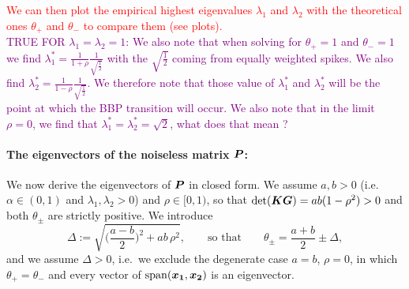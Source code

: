 \documentclass[11pt]{article}
\begin{document}
\textcolor{red}{We can then plot the empirical highest eigenvalues $\lambda_1$ and $\lambda_2$ with the theoretical ones $\theta_+$ and $\theta_-$ to compare them (see plots).}\\
\textcolor{purple}{TRUE FOR $\lambda_1 = \lambda_2=1$: We also note that when solving for $\theta_+ = 1$ and $\theta_- = 1$ we find $\lambda^*_1 = \frac{1}{1 + \rho} \frac{1}{\sqrt{\frac{1}{2}}}$ with the $\sqrt{\frac{1}{2}}$ coming from equally weighted spikes. We also find $\lambda^*_2 = \frac{1}{1 - \rho} \frac{1}{\sqrt{\frac{1}{2}}}$. We therefore note that those value of $\lambda^*_1$ and $\lambda^*_2$ will be the point at which the BBP transition will occur. We also note that in the limit $\rho = 0$, we find that $\lambda_1^*=\lambda^*_2=\sqrt{2}$, what does that mean ?}

\paragraph{The eigenvectors of the noiseless matrix $\bm{P}$:}
We now derive the eigenvectors of $\bm{P}$ in closed form. We assume $a, b > 0$ (i.e.\ $\alpha \in (0,1)$ and $\lambda_1, \lambda_2 > 0$) and $\rho \in [0,1)$, so that $\mathrm{det}(\bm{K} \bm{G}) = ab(1-\rho^2) > 0$ and both $\theta_\pm$ are strictly positive. We introduce
\begin{equation}
    \Delta := \sqrt{\Big(\frac{a-b}{2}\Big)^2 + ab\,\rho^2},
    \qquad \text{so that} \qquad
    \theta_\pm = \frac{a+b}{2} \pm \Delta,
    \label{eq:Delta}
\end{equation}
and we assume $\Delta > 0$, i.e.\ we exclude the degenerate case $a = b$, $\rho = 0$, in which $\theta_+ = \theta_-$ and every vector of $\operatorname{span}(\bm{x_1},\bm{x_2})$ is an eigenvector.
\end{document}
